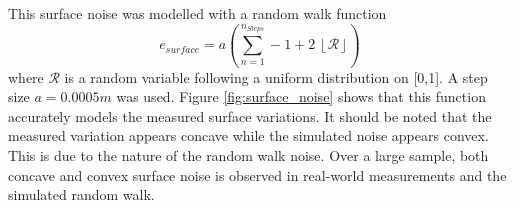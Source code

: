 		This surface noise was modelled with a random walk function
		\begin{equation}
			e_{surface} = a \left(\sum_{n = 1}^{n_{Steps}}-1 + 2\:\left \lfloor{\mathcal{R}}\right \rfloor \right)
		\end{equation} 
		where $\mathcal{R}$ is a random variable following a uniform distribution on [0,1]. A step size $a = 0.0005m$ was used. Figure \ref{fig:surface_noise} shows that this function accurately models the measured surface variations. It should be noted that the measured variation appears concave while the simulated noise appears convex. This is due to the nature of the random walk noise. Over a large sample, both concave and convex surface noise is observed in real-world measurements and the simulated random walk.

		\begin{figure}
	  		\centering
\end{figure}
